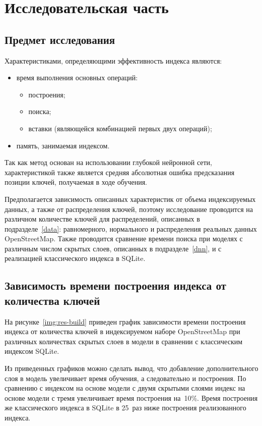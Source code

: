 \chapter{\label{research}Исследовательская часть}

\section{Предмет исследования}

Характеристиками, определяющими эффективность индекса являются:

\begin{itemize}
    \item время выполнения основных операций:
\begin{itemize}[wide=\dimexpr\parindent-2em+\relax, leftmargin=* ]
    \item построения;
    \item поиска;
    \item вставки (являющейся
        комбинацией первых двух операций);
\end{itemize}
    \item память, занимаемая индексом.
\end{itemize}

Так как метод основан на использовании глубокой нейронной сети,
характеристикой также является средняя абсолютная ошибка предсказания позиции
ключей, получаемая в ходе обучения.

Предполагается зависимость описанных характеристик от объема индексируемых
данных, а также от распределения ключей, поэтому исследование проводится на
различном количестве ключей для распределений, описанных в
подразделе~\ref{data}: равномерного, нормального и распределения реальных данных
OpenStreetMap. Также проводится сравнение времени поиска при моделях с различным
числом скрытых слоев, описанных в подразделе~\ref{dnn}, и с реализацией
классического индекса в SQLite.

\section{Зависимость времени построения индекса от количества ключей}

На рисунке~\ref{img:res-build} приведен график зависимости времени построения
индекса от количества ключей в индексируемом наборе OpenStreetMap при различных
количествах скрытых слоев в модели в сравнении с классическим индексом SQLite.

Из приведенных графиков можно сделать вывод, что добавление дополнительного слоя
в модель увеличивает время обучения, а следовательно и построения. По сравнению
с индексом на основе модели с двумя скрытыми слоями индекс на основе модели с
тремя увеличивает время построения на~10\%. Время построения же классического
индекса в SQLite в 25~раз ниже построения реализованного индекса.

